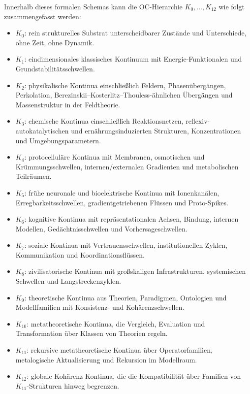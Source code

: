 Innerhalb dieses formalen Schemas kann die OC-Hierarchie \(K_0,\dots,K_{12}\)
wie folgt zusammengefasst werden:

\begin{itemize}
    \item \(K_0\): rein strukturelles Substrat unterscheidbarer Zustände und
          Unterschiede, ohne Zeit, ohne Dynamik.
    \item \(K_1\): eindimensionales klassisches Kontinuum mit
          Energie-Funktionalen und Grundstabilitätsschwellen.
    \item \(K_2\): physikalische Kontinua einschließlich Feldern,
          Phasenübergängen, Perkolation, Berezinskii--Kosterlitz--Thouless-ähnlichen
          Übergängen und Massenstruktur in der Feldtheorie.
    \item \(K_3\): chemische Kontinua einschließlich Reaktionsnetzen,
          reflexiv-autokatalytischen und ernährungsinduzierten Strukturen,
          Konzentrationen und Umgebungsparametern.
    \item \(K_4\): protocelluläre Kontinua mit Membranen, osmotischen
          und Krümmungsschwellen, internen/externalen Gradienten und
          metabolischen Teilräumen.
    \item \(K_5\): frühe neuronale und bioelektrische Kontinua mit Ionenkanälen,
          Erregbarkeitsschwellen, gradientgetriebenen Flüssen und Proto-Spikes.
    \item \(K_6\): kognitive Kontinua mit repräsentationalen Achsen,
          Bindung, internen Modellen, Gedächtnisschwellen und
          Vorhersageschwellen.
    \item \(K_7\): soziale Kontinua mit Vertrauensschwellen, institutionellen
          Zyklen, Kommunikation und Koordinationsflüssen.
    \item \(K_8\): zivilisatorische Kontinua mit großskaligen
          Infrastrukturen, systemischen Schwellen und Langstreckenzyklen.
    \item \(K_9\): theoretische Kontinua aus Theorien, Paradigmen,
          Ontologien und Modellfamilien mit Konsistenz- und Kohärenzschwellen.
    \item \(K_{10}\): metatheoretische Kontinua, die Vergleich, Evaluation
          und Transformation über Klassen von Theorien regeln.
    \item \(K_{11}\): rekursive metatheoretische Kontinua über
          Operatorfamilien, metalogische Aktualisierung und Rekursion im
          Modellraum.
    \item \(K_{12}\): globale Kohärenz-Kontinua, die die Kompatibilität über
          Familien von \(K_{11}\)-Strukturen hinweg begrenzen.
\end{itemize}

